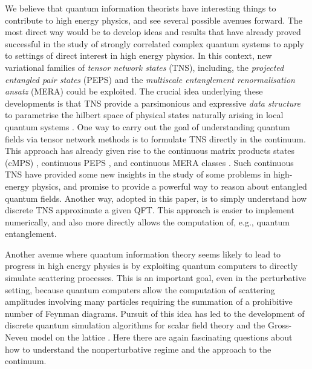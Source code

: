 \documentclass[11pt]{amsart}
\theoremstyle{plain}%
\theoremstyle{definition}
\theoremstyle{remark}
\begin{document}
We believe that quantum information theorists have interesting things to contribute to high energy physics, and see several possible avenues forward. The most direct way would be to develop ideas and results that have already proved successful in the study of strongly correlated complex quantum systems to apply to settings of direct interest in high energy physics. In this context, new variational families of \emph{tensor network states} (TNS), including, the \emph{projected entangled pair states} (PEPS) \cite{verstraete_renormalization_2004} and the \emph{multiscale entanglement renormalisation ansatz} (MERA) \cite{vidal_entanglement_2007,vidal_class_2008} could be exploited. The crucial idea underlying these developments is that TNS provide a parsimonious and expressive \emph{data structure} to parametrise  the hilbert space of physical states naturally arising \cite{poulin_quantum_2011} in local quantum systems \cite{orus_practical_2014, haegeman_geometry_2014,osborne_simulating_2007,bravyi_topological_2010,bravyi_short_2011,hastings_lieb-schultz-mattis_2004,hastings_area_2007,osborne_efficient_2006}. One way to carry out the goal of understanding quantum fields via tensor network methods is to formulate TNS directly in the continuum. This approach has already given rise to the continuous matrix products states (cMPS) \cite{verstraete_continuous_2010,osborne_holographic_2010, haegeman_calculus_2013}, continuous PEPS \cite{jennings_variational_2012}, and continuous MERA classes \cite{haegeman_entanglement_2013}. Such continuous TNS have provided some new insights in the study of some problems in high-energy physics, and promise to provide a powerful way to reason about entangled quantum fields. Another way, adopted in this paper, is to simply understand how discrete TNS approximate a given QFT. This approach is easier to implement numerically, and also more directly allows the computation of, e.g., quantum entanglement.

Another avenue where quantum information theory seems likely to lead to progress in high energy physics is by exploiting quantum computers to directly simulate scattering processes. This is an important goal, even in the perturbative setting, because quantum computers allow the computation of scattering amplitudes involving many particles requiring the summation of a prohibitive number of Feynman diagrams. Pursuit of this idea has led to the development of discrete quantum simulation algorithms for scalar field theory \cite{jordan_quantum_2012,jordan_quantum_2011} and the Gross-Neveu model on the lattice \cite{jordan_quantum_2014}. Here there are again fascinating questions about how to understand the nonperturbative regime and the approach to the continuum.  
\end{document}
